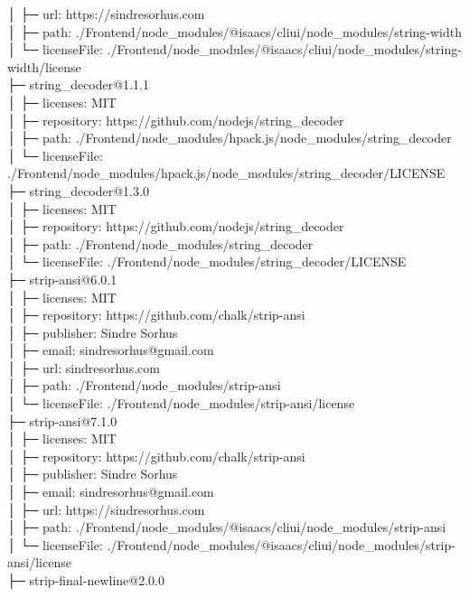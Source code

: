 │  ├─ url: https://sindresorhus.com\\
│  ├─ path: ./Frontend/node\_modules/@isaacs/cliui/node\_modules/string-width\\
│  └─ licenseFile: ./Frontend/node\_modules/@isaacs/cliui/node\_modules/string-width/license\\
├─ string\_decoder@1.1.1\\
│  ├─ licenses: MIT\\
│  ├─ repository: https://github.com/nodejs/string\_decoder\\
│  ├─ path: ./Frontend/node\_modules/hpack.js/node\_modules/string\_decoder\\
│  └─ licenseFile: ./Frontend/node\_modules/hpack.js/node\_modules/string\_decoder/LICENSE\\
├─ string\_decoder@1.3.0\\
│  ├─ licenses: MIT\\
│  ├─ repository: https://github.com/nodejs/string\_decoder\\
│  ├─ path: ./Frontend/node\_modules/string\_decoder\\
│  └─ licenseFile: ./Frontend/node\_modules/string\_decoder/LICENSE\\
├─ strip-ansi@6.0.1\\
│  ├─ licenses: MIT\\
│  ├─ repository: https://github.com/chalk/strip-ansi\\
│  ├─ publisher: Sindre Sorhus\\
│  ├─ email: sindresorhus@gmail.com\\
│  ├─ url: sindresorhus.com\\
│  ├─ path: ./Frontend/node\_modules/strip-ansi\\
│  └─ licenseFile: ./Frontend/node\_modules/strip-ansi/license\\
├─ strip-ansi@7.1.0\\
│  ├─ licenses: MIT\\
│  ├─ repository: https://github.com/chalk/strip-ansi\\
│  ├─ publisher: Sindre Sorhus\\
│  ├─ email: sindresorhus@gmail.com\\
│  ├─ url: https://sindresorhus.com\\
│  ├─ path: ./Frontend/node\_modules/@isaacs/cliui/node\_modules/strip-ansi\\
│  └─ licenseFile: ./Frontend/node\_modules/@isaacs/cliui/node\_modules/strip-ansi/license\\
├─ strip-final-newline@2.0.0\\
